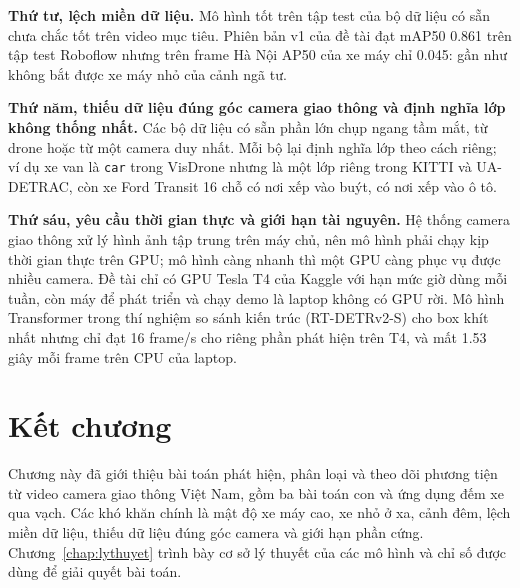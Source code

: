 \textbf{Thứ tư, lệch miền dữ liệu.} Mô hình tốt trên tập test của bộ dữ liệu có sẵn chưa chắc tốt trên video mục tiêu.
Phiên bản v1 của đề tài đạt mAP50 0.861 trên tập test Roboflow nhưng trên frame Hà Nội AP50 của xe máy chỉ 0.045:
gần như không bắt được xe máy nhỏ của cảnh ngã tư.

\textbf{Thứ năm, thiếu dữ liệu đúng góc camera giao thông và định nghĩa lớp không thống nhất.} Các bộ dữ liệu có sẵn
phần lớn chụp ngang tầm mắt, từ drone hoặc từ một camera duy nhất. Mỗi bộ lại định nghĩa lớp theo cách riêng; ví dụ
xe van là \texttt{car} trong VisDrone nhưng là một lớp riêng trong KITTI và UA-DETRAC, còn xe Ford Transit 16 chỗ có
nơi xếp vào buýt, có nơi xếp vào ô tô.

\textbf{Thứ sáu, yêu cầu thời gian thực và giới hạn tài nguyên.} Hệ thống camera giao thông xử lý hình ảnh tập trung
trên máy chủ, nên mô hình phải chạy kịp thời gian thực trên GPU; mô hình càng nhanh thì một GPU càng phục vụ được nhiều
camera. Đề tài chỉ có GPU Tesla T4 của Kaggle với hạn mức giờ dùng mỗi tuần, còn máy để phát triển và chạy demo là
laptop không có GPU rời. Mô hình Transformer trong thí nghiệm so sánh kiến trúc (RT-DETRv2-S) cho box khít nhất nhưng
chỉ đạt 16 frame/s cho riêng phần phát hiện trên T4, và mất 1.53 giây mỗi frame trên CPU của laptop.

\section{Kết chương}

Chương này đã giới thiệu bài toán phát hiện, phân loại và theo dõi phương tiện từ video camera giao thông Việt Nam,
gồm ba bài toán con và ứng dụng đếm xe qua vạch. Các khó khăn chính là mật độ xe máy cao, xe nhỏ ở xa, cảnh đêm, lệch
miền dữ liệu, thiếu dữ liệu đúng góc camera và giới hạn phần cứng. Chương~\ref{chap:lythuyet} trình bày cơ sở lý
thuyết của các mô hình và chỉ số được dùng để giải quyết bài toán.
